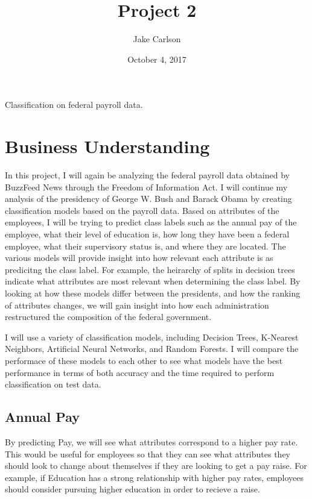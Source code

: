 \documentclass{article}
\begin{document}
\title{Project 2}
\author{Jake Carlson}
\date{October 4, 2017}
\maketitle

\abstract
Classification on federal payroll data.
\newpage

\tableofcontents
\newpage

\section{Business Understanding}
In this project, I will again be analyzing the federal payroll data obtained by BuzzFeed News through the Freedom of Information Act. I will continue my analysis of the presidency of George W. Bush and Barack Obama by creating classification models based on the payroll data. Based on attributes of the employees, I will be trying to predict class labels such as the annual pay of the employee, what their level of education is, how long they have been a federal employee, what their supervisory status is, and where they are located. The various models will provide insight into how relevant each attribute is as predicitng the class label. For example, the heirarchy of splits in decision trees indicate what attributes are most relevant when determining the class label. By looking at how these models differ between the presidents, and how the ranking of attributes changes, we will gain insight into how each administration restructured the composition of the federal government.
\par
I will use a variety of classification models, including Decision Trees, K-Nearest Neighbors, Artificial Neural Networks, and Random Forests. I will compare the performace of these models to each other to see what models have the best performance in terms of both accuracy and the time required to perform classification on test data.

    \subsection{Annual Pay}
    By predicting Pay, we will see what attributes correspond to a higher pay rate. This would be useful for employees so that they can see what attributes they should look to change about themselves if they are looking to get a pay raise. For example, if Education has a strong relationship with higher pay rates, employees should consider pursuing higher education in order to recieve a raise.
\end{document}
